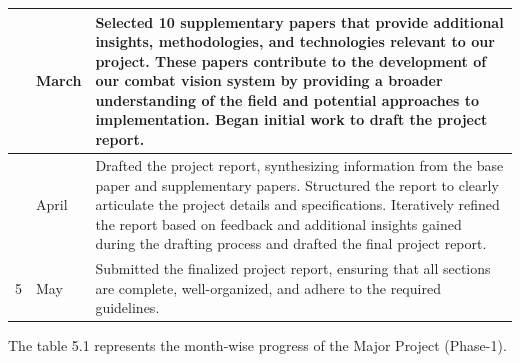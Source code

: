 \begin{center}
\begin{longtable}{
        |>{\centering\arraybackslash}m{1.22cm}
        |>{\raggedright\arraybackslash}m{2.5cm}
        |>{\raggedright\arraybackslash}m{10.1cm}|
        }
        3                &
        March            &
        Selected 10 supplementary papers that provide additional insights, methodologies, and technologies relevant to our project. These papers contribute to the development of our combat vision system by providing a broader understanding of the field and potential approaches to implementation. Began initial work to draft the project report. \\
        \hline

        4                &
        April            &
        Drafted the project report, synthesizing information from the base paper and supplementary papers. Structured the report to clearly articulate the project details and specifications. Iteratively refined the report based on feedback and additional insights gained during the drafting process and drafted the final project report.         \\
        \hline

        5                &
        May              &
        Submitted the finalized project report, ensuring that all sections are complete, well-organized, and adhere to the required guidelines.                                                                                                                                                                                                          \\
        \hline
    \end{longtable}
\end{center}

\vspace{-36pt}The table 5.1 represents the month-wise progress of the Major Project (Phase-1).